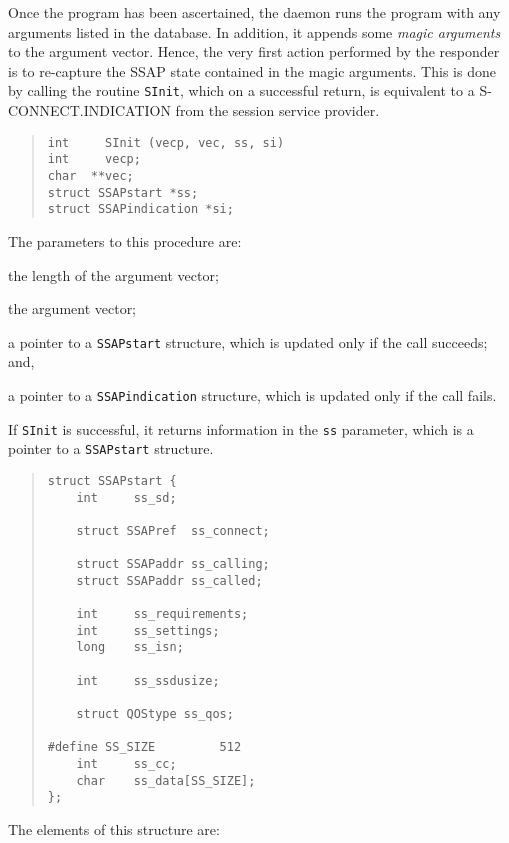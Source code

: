 Once the program has been ascertained,
the daemon runs the program with any arguments listed in the database.
In addition,
it appends some {\em magic arguments\/} to the argument vector.
Hence,
the very first action performed by the responder is to re-capture the SSAP
state contained in the magic arguments.
This is done by calling the routine \verb"SInit",
which on a successful return,
is equivalent to a {\sf S-CONNECT.INDICATION\/} from the session service
provider.
\begin{quote}\small\begin{verbatim}
int     SInit (vecp, vec, ss, si)
int     vecp;
char  **vec;
struct SSAPstart *ss;
struct SSAPindication *si;
\end{verbatim}\end{quote}
The parameters to this procedure are:
\begin{describe}
\item[\verb"vecp":] the length of the argument vector;

\item[\verb"vec":] the argument vector;

\item[\verb"ss":] a pointer to a \verb"SSAPstart" structure, which is updated
only if the call succeeds;
and,

\item[\verb"si":] a pointer to a \verb"SSAPindication" structure, which is
updated only if the call fails.
\end{describe}
If \verb"SInit" is successful,
it returns information in the \verb"ss" parameter,
which is a pointer to a \verb"SSAPstart" structure.
\begin{quote}\small\begin{verbatim}
struct SSAPstart {
    int     ss_sd;

    struct SSAPref  ss_connect;

    struct SSAPaddr ss_calling;
    struct SSAPaddr ss_called;

    int     ss_requirements;
    int     ss_settings;
    long    ss_isn;

    int     ss_ssdusize;

    struct QOStype ss_qos;

#define SS_SIZE         512
    int     ss_cc;
    char    ss_data[SS_SIZE];
};
\end{verbatim}\end{quote}
The elements of this structure are:

